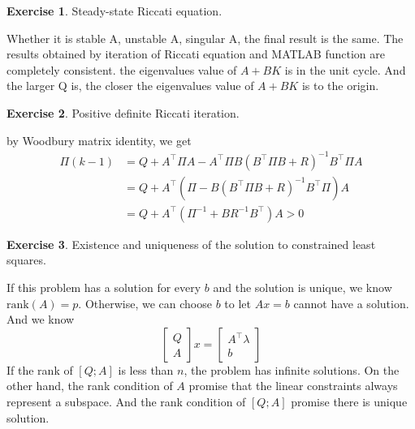 \documentclass[11pt,a4paper]{report}
\theoremstyle{definition}\newtheorem{exercise}{Exercise}[chapter]
\begin{document}
\begin{exercise}Steady-state Riccati equation.\\
\end{exercise}
\begin{answer}
Whether it is stable A, unstable A, singular A, the final result is the same. The results obtained by iteration of Riccati equation and MATLAB function are completely consistent. the eigenvalues value of $A+BK$ is in the unit cycle. And the larger Q is, the closer the eigenvalues value of $A+BK$ is to the origin. 
\end{answer}


\begin{exercise}Positive definite Riccati iteration.\\
\end{exercise}

\begin{answer}
by Woodbury matrix identity, we get
\begin{align*}
    \Pi(k-1)&=Q+A^\top\Pi A-A^\top\Pi B(B^\top\Pi B+R)^{-1}B^\top\Pi A\\
    &=Q+A^\top(\Pi- B(B^\top\Pi B+R)^{-1}B^\top\Pi) A\\
    &=Q+A^\top(\Pi^{-1}+BR^{-1}B^\top)A>0
\end{align*}
\end{answer}

\begin{exercise}Existence and uniqueness of the solution to constrained least squares.\\
\end{exercise}
\begin{answer}
If this problem has a solution for every $b$ and the solution is unique, we know $\text{rank}(A)=p$. Otherwise, we can choose $b$ to let $Ax=b$ cannot have a solution. And we know
\begin{equation}
    \begin{bmatrix}
        Q\\A
    \end{bmatrix}x=
    \begin{bmatrix}
        A^\top \lambda \\b
    \end{bmatrix}
\end{equation}
If the rank of $[Q;A]$ is less than $n$, the problem has infinite solutions.
On the other hand, the rank condition of $A$ promise that the linear constraints always represent a subspace. And the rank condition of $[Q;A]$ promise there is unique solution.
\end{answer}
\end{document}
